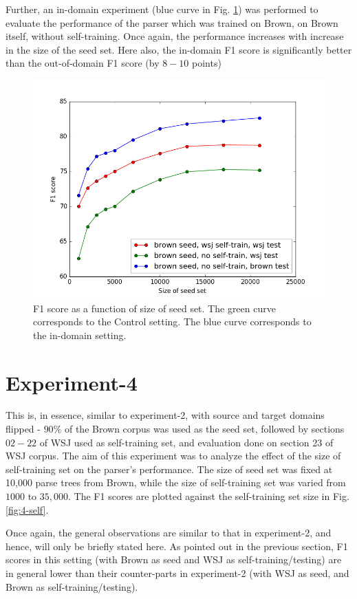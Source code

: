 \documentclass{sig-alternate-05-2015}
\begin{document}
Further, an in-domain experiment (blue curve in Fig. \ref{fig:3-seed}) was performed to evaluate the performance of the parser which was trained on Brown, on Brown itself, without self-training. Once again, the performance increases with increase in the size of the seed set. Here also, the in-domain F1 score is significantly better than the out-of-domain F1 score (by $8-10$ points)

\begin{figure}
\centering
\includegraphics[width=0.95\columnwidth]{figs/fig-3-seed}
\caption{F1 score as a function of size of seed set. The green curve corresponds to the Control setting. The blue curve corresponds to the in-domain setting.}
\label{fig:3-seed}
\end{figure}

\section{Experiment-4}
This is, in essence, similar to experiment-2, with source and target domains flipped - $90\%$ of the Brown corpus was used as the seed set, followed by sections $02-22$ of WSJ used as self-training set, and evaluation done on section 23 of WSJ corpus. The aim of this experiment was to analyze the effect of the size of self-training set on the parser's performance. The size of seed set was fixed at 10,000 parse trees from Brown, while the size of self-training set was varied from $1000$ to $35,000$. The F1 scores are plotted against the self-training set size in Fig.\ref{fig:4-self}.

Once again, the general observations are similar to that in experiment-2, and hence, will only be briefly stated here. As pointed out in the previous section, F1 scores in this setting (with Brown as seed and WSJ as self-training/testing) are in general lower than their counter-parts in experiment-2 (with WSJ as seed, and Brown as self-training/testing).
\end{document}
